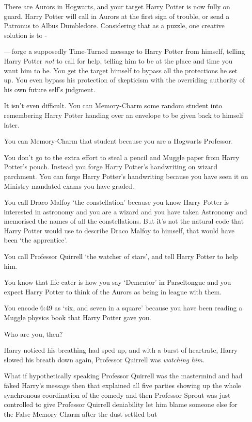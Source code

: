 There are Aurors in Hogwarts, and your target Harry Potter is now fully on guard. Harry Potter will call in Aurors at the first sign of trouble, or send a Patronus to Albus Dumbledore. Considering that as a puzzle, one creative solution is to -

---\,forge a supposedly Time-Turned message to Harry Potter from himself, telling Harry Potter \emph{not} to call for help, telling him to be at the place and time you want him to be. You get the target himself to bypass all the protections he set up. You even bypass his protection of skepticism with the overriding authority of his own future self's judgment.

It isn't even difficult. You can Memory-Charm some random student into remembering Harry Potter handing over an envelope to be given back to himself later.

You can Memory-Charm that student because you are a Hogwarts Professor.

You don't go to the extra effort to steal a pencil and Muggle paper from Harry Potter's pouch. Instead you forge Harry Potter's handwriting on wizard parchment. You can forge Harry Potter's handwriting because you have seen it on Ministry-mandated exams you have graded.

You call Draco Malfoy `the constellation' because you know Harry Potter is interested in astronomy and you are a wizard and you have taken Astronomy and memorised the names of all the constellations. But it's not the natural code that Harry Potter would use to describe Draco Malfoy to himself, that would have been `the apprentice'.

You call Professor Quirrell `the watcher of stars', and tell Harry Potter to help him.

You know that life-eater is how you say `Dementor' in Parseltongue and you expect Harry Potter to think of the Aurors as being in league with them.

You encode 6:49 as `six, and seven in a square' because you have been reading a Muggle physics book that Harry Potter gave you.

Who are you, then?

Harry noticed his breathing had sped up, and with a burst of heartrate, Harry slowed his breath down again, Professor Quirrell was \emph{watching him}.

What if hypothetically speaking Professor Quirrell was the mastermind and had faked Harry's message then that explained all five parties showing up the whole synchronous coordination of the comedy and then Professor Sprout was just controlled to give Professor Quirrell deniability let him blame someone else for the False Memory Charm after the dust settled but

